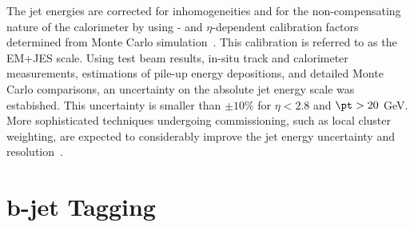 The jet energies are corrected for inhomogeneities and for
the non-compensating nature of the calorimeter by using \pt- and $\eta$-dependent calibration factors determined from Monte Carlo simulation~\cite{JESnote}. This calibration is referred to as the EM+JES scale.
Using test beam results, in-situ track and calorimeter measurements, estimations of pile-up energy depositions, and detailed Monte Carlo comparisons, an uncertainty on the absolute jet energy scale was estabished. This uncertainty is smaller than $\pm 10\%$ for $\eta < 2.8$ and $\pt > 20$ GeV. More sophisticated techniques undergoing commissioning, such as local cluster weighting, are expected to considerably improve the jet energy uncertainty and resolution~\cite{CSC}. 




\section{ $\bm b$-jet Tagging}\label{sec:btagging}

